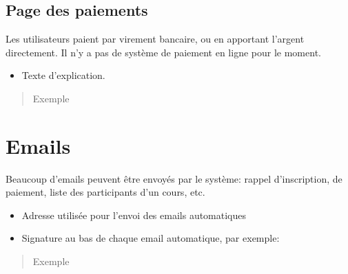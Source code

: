 \documentclass[letterpaper,10pt,english]{sphinxmanual}
\begin{document}
\subsection{Page des paiements}
\label{configurer:page-des-paiements}
Les utilisateurs paient par virement bancaire, ou en apportant l'argent directement. Il n'y a pas de système de paiement en ligne pour le moment.
\begin{itemize}
\item {} 
Texte d'explication.

\end{itemize}
\begin{quote}\begin{description}
\item[{Exemple}] \leavevmode
{}

\end{description}\end{quote}


\section{Emails}
\label{configurer:emails}
Beaucoup d'emails peuvent être envoyés par le système: rappel d'inscription, de paiement, liste des participants d'un cours, etc.
\begin{itemize}
\item {} 
Adresse utilisée pour l'envoi des emails automatiques

\item {} 
Signature au bas de chaque email automatique, par exemple:

\end{itemize}
\begin{quote}\begin{description}
\item[{Exemple}] \leavevmode
{}

\end{description}\end{quote}
\end{document}
